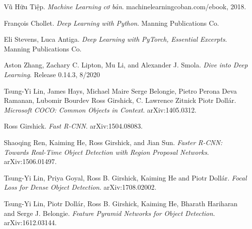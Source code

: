 \documentclass[a4paper, 12pt]{report}
\begin{document}
\newpage
{}
\begin{thebibliography}{9}
	Vũ Hữu Tiệp. 
	\textit{Machine Learning cơ bản}. machinelearningcoban.com/ebook, 2018.
	
	François Chollet. 
	\textit{Deep Learning with Python}.  Manning Publications Co.
	
	Eli Stevens, Luca Antiga. 
	\textit{Deep Learning with PyTorch, Essential Excerpts}.  Manning Publications Co.
	
	Aston Zhang, Zachary C. Lipton, Mu Li, and Alexander J. Smola. 
	\textit{Dive into Deep Learning}. Release 0.14.3, 8/2020
	
	Tsung-Yi Lin,
	James Hays,
	Michael Maire Serge Belongie,
	Pietro Perona Deva Ramanan,
	Lubomir Bourdev Ross Girshick,
	C. Lawrence Zitnick Piotr Dollár. 
	\textit{Microsoft COCO: Common Objects in Context}.  
	arXiv:1405.0312.
	
	Ross Girshick. 
	\textit{Fast R-CNN}.  
	arXiv:1504.08083.
	
	Shaoqing Ren, Kaiming He, Ross Girshick, and Jian Sun. 
	\textit{Faster R-CNN: Towards Real-Time Object
		Detection with Region Proposal Networks}.  
	arXiv:1506.01497.
		
	Tsung{-}Yi Lin,
               Priya Goyal,
               Ross B. Girshick,
               Kaiming He and
               Piotr Doll{\'{a}}r.
	\textit{Focal Loss for Dense Object Detection}.  
	arXiv:1708.02002.
	
	Tsung{-}Yi Lin,
               Piotr Doll{\'{a}}r,
               Ross B. Girshick,
               Kaiming He,
               Bharath Hariharan and
               Serge J. Belongie.
	\textit{Feature Pyramid Networks for Object Detection}.  
	arXiv:1612.03144.
	
\end{thebibliography}
\end{document}
